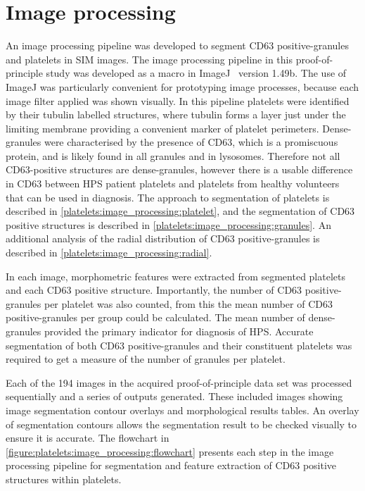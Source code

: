 \section{Image processing}
\label{platelets:image_processing}
An image processing pipeline was developed to segment CD63 positive-granules and platelets in SIM images. The image processing pipeline in this proof-of-principle study was developed as a macro in ImageJ~\cite{Schneider2012} version 1.49b. The use of ImageJ was particularly convenient for prototyping image processes, because each image filter applied was shown visually. In this pipeline platelets were identified by their tubulin labelled structures, where tubulin forms a layer just under the limiting membrane providing a convenient marker of platelet perimeters. Dense-granules were characterised by the presence of CD63, which is a promiscuous protein, and is likely found in all granules and in lysosomes. Therefore not all CD63-positive structures are dense-granules, however there is a usable difference in CD63 between HPS patient platelets and platelets from healthy volunteers that can be used in diagnosis. The approach to segmentation of platelets is described in \autoref{platelets:image_processing:platelet}, and the segmentation of CD63 positive structures is described in \autoref{platelets:image_processing:granules}. An additional analysis of the radial distribution of CD63 positive-granules is described in \autoref{platelets:image_processing:radial}.

In each image, morphometric features were extracted from segmented platelets and each CD63 positive structure. Importantly, the number of CD63 positive-granules per platelet was also counted, from this the mean number of CD63 positive-granules per group could be calculated. The mean number of dense-granules provided the primary indicator for diagnosis of HPS. Accurate segmentation of both CD63 positive-granules and their constituent platelets was required to get a measure of the number of granules per platelet.

Each of the 194 images in the acquired proof-of-principle data set was processed sequentially and a series of outputs generated. These included images showing image segmentation contour overlays and morphological results tables. An overlay of segmentation contours allows the segmentation result to be checked visually to ensure it is accurate. The flowchart in \autoref{figure:platelets:image_processing:flowchart} presents each step in the image processing pipeline for segmentation and feature extraction of CD63 positive structures within platelets.

